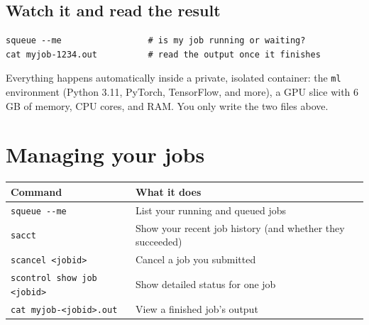 \documentclass[11pt]{article}
\newcommand{\ShardMem}{6\,GB}                          %
\newcommand{\code}[1]{\texttt{#1}}
\begin{document}
\subsection{Watch it and read the result}
\begin{lstlisting}
squeue --me                 # is my job running or waiting?
cat myjob-1234.out          # read the output once it finishes
\end{lstlisting}

\begin{notebox}
Everything happens automatically inside a private, isolated container: the \code{ml} environment (Python 3.11, PyTorch, TensorFlow, and more), a GPU slice with \ShardMem{} of memory, CPU cores, and RAM. You only write the two files above.
\end{notebox}

\section{Managing your jobs}
\begin{center}
\begin{tabularx}{\linewidth}{@{}l X@{}}
\toprule
\textbf{Command} & \textbf{What it does} \\
\midrule
\code{squeue -{}-me} & List your running and queued jobs \\
\code{sacct} & Show your recent job history (and whether they succeeded) \\
\code{scancel <jobid>} & Cancel a job you submitted \\
\code{scontrol show job <jobid>} & Show detailed status for one job \\
\code{cat myjob-<jobid>.out} & View a finished job's output \\
\bottomrule
\end{tabularx}
\end{center}

\end{document}
